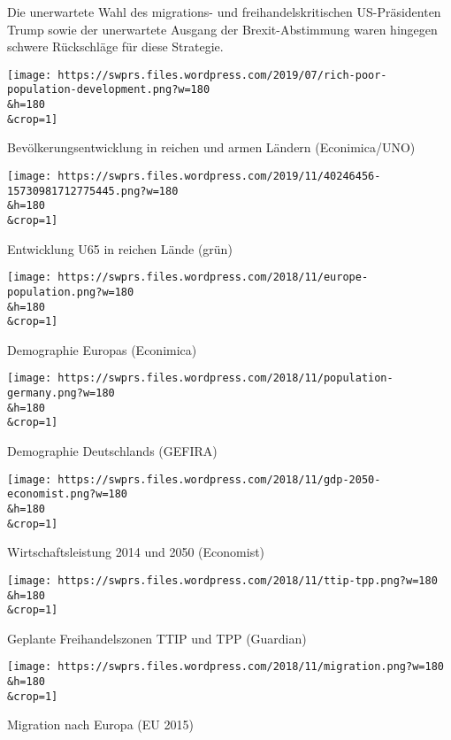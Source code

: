 Die unerwartete Wahl des migrations- und freihandelskritischen
US-Präsidenten Trump sowie der uner­wartete Ausgang der
Brexit-Abstimmung waren hingegen schwere Rückschläge für diese
Strategie.

\href{https://swprs.files.wordpress.com/2019/07/rich-poor-population-development.png}{}

\texttt{[image: https://swprs.files.wordpress.com/2019/07/rich-poor-population-development.png?w=180\\\&h=180\\\&crop=1]}

Bevölkerungsentwicklung in reichen und armen Ländern (Econimica/UNO)

\href{https://swprs.files.wordpress.com/2019/11/40246456-15730981712775445.png}{}

\texttt{[image: https://swprs.files.wordpress.com/2019/11/40246456-15730981712775445.png?w=180\\\&h=180\\\&crop=1]}

Entwicklung U65 in reichen Lände (grün)

\href{https://swprs.files.wordpress.com/2018/11/europe-population.png}{}

\texttt{[image: https://swprs.files.wordpress.com/2018/11/europe-population.png?w=180\\\&h=180\\\&crop=1]}

Demographie Europas (Econimica)

\href{https://swprs.files.wordpress.com/2018/11/population-germany.png}{}

\texttt{[image: https://swprs.files.wordpress.com/2018/11/population-germany.png?w=180\\\&h=180\\\&crop=1]}

Demographie Deutschlands (GEFIRA)

\href{https://swprs.files.wordpress.com/2018/11/gdp-2050-economist.png}{}

\texttt{[image: https://swprs.files.wordpress.com/2018/11/gdp-2050-economist.png?w=180\\\&h=180\\\&crop=1]}

Wirtschaftsleistung 2014 und 2050 (Economist)

\href{https://swprs.files.wordpress.com/2018/11/ttip-tpp.png}{}

\texttt{[image: https://swprs.files.wordpress.com/2018/11/ttip-tpp.png?w=180\\\&h=180\\\&crop=1]}

Geplante Freihandelszonen TTIP und TPP (Guardian)

\href{https://swprs.files.wordpress.com/2018/11/migration.png}{}

\texttt{[image: https://swprs.files.wordpress.com/2018/11/migration.png?w=180\\\&h=180\\\&crop=1]}

Migration nach Europa (EU 2015)

